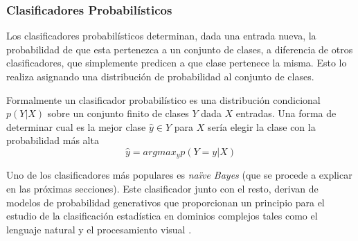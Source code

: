 \subsubsection{Clasificadores Probabilísticos}

		Los clasificadores probabilísticos determinan, dada una entrada nueva, la probabilidad de que esta pertenezca a un conjunto de clases, a diferencia de otros clasificadores, que simplemente predicen a que clase pertenece la misma. Esto lo realiza asignando una distribución de probabilidad al conjunto de clases.
	
	Formalmente un clasificador probabilístico es una distribución condicional $p(Y|X)$ sobre un conjunto finito de clases $Y$ dada $X$ entradas. Una forma de determinar cual es la mejor clase $\hat{y} \in Y$ para $X$ sería elegir la clase con la probabilidad más alta
	$$\hat{y} = argmax_{y}p(Y=y|X) $$
	
	Uno de los clasificadores más populares es \textit{na\"{i}ve Bayes} (que se procede a explicar en las próximas secciones). Este clasificador junto con el resto, derivan de modelos de probabilidad generativos que proporcionan un principio para el estudio de la clasificación estadística en dominios complejos tales como el lenguaje natural y el procesamiento visual \cite{GargRo01}.
